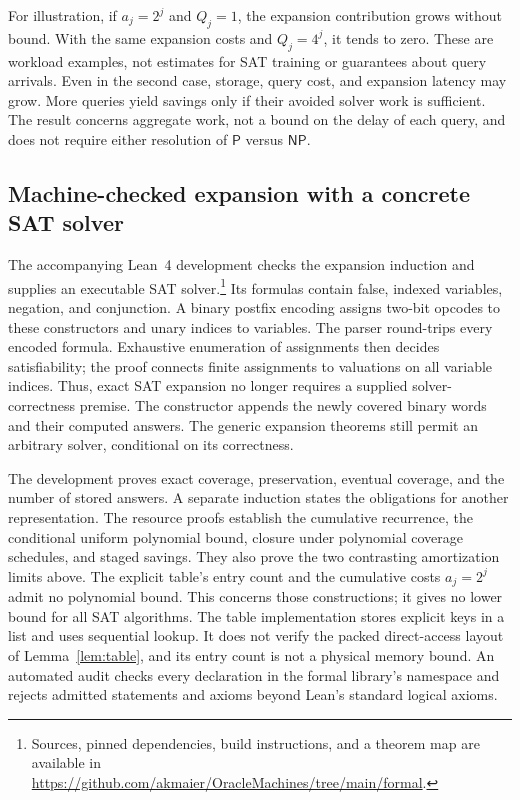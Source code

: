 \documentclass[11pt,a4paper]{article}
\numberwithin{equation}{section}
\newcommand{\Pclass}{\mathsf{P}}
\newcommand{\NPclass}{\mathsf{NP}}
\theoremstyle{plain}
\theoremstyle{definition}
\theoremstyle{remark}
\begin{document}
For illustration, if $a_j=2^j$ and $Q_j=1$, the expansion contribution grows without bound. With the same expansion costs and $Q_j=4^j$, it tends to zero. These are workload examples, not estimates for SAT training or guarantees about query arrivals. Even in the second case, storage, query cost, and expansion latency may grow. More queries yield savings only if their avoided solver work is sufficient. The result concerns aggregate work, not a bound on the delay of each query, and does not require either resolution of $\Pclass$ versus $\NPclass$.

\subsection{Machine-checked expansion with a concrete SAT solver}
\label{sec:lean-scope}

The accompanying Lean~4 development checks the expansion induction and supplies an executable SAT solver.\footnote{Sources, pinned dependencies, build instructions, and a theorem map are available in \url{https://github.com/akmaier/OracleMachines/tree/main/formal}.} Its formulas contain false, indexed variables, negation, and conjunction. A binary postfix encoding assigns two-bit opcodes to these constructors and unary indices to variables. The parser round-trips every encoded formula. Exhaustive enumeration of assignments then decides satisfiability; the proof connects finite assignments to valuations on all variable indices. Thus, exact SAT expansion no longer requires a supplied solver-correctness premise. The constructor appends the newly covered binary words and their computed answers. The generic expansion theorems still permit an arbitrary solver, conditional on its correctness.

The development proves exact coverage, preservation, eventual coverage, and the number of stored answers. A separate induction states the obligations for another representation. The resource proofs establish the cumulative recurrence, the conditional uniform polynomial bound, closure under polynomial coverage schedules, and staged savings. They also prove the two contrasting amortization limits above. The explicit table's entry count and the cumulative costs $a_j=2^j$ admit no polynomial bound. This concerns those constructions; it gives no lower bound for all SAT algorithms. The table implementation stores explicit keys in a list and uses sequential lookup. It does not verify the packed direct-access layout of Lemma~\ref{lem:table}, and its entry count is not a physical memory bound. An automated audit checks every declaration in the formal library's namespace and rejects admitted statements and axioms beyond Lean's standard logical axioms.
\end{document}
